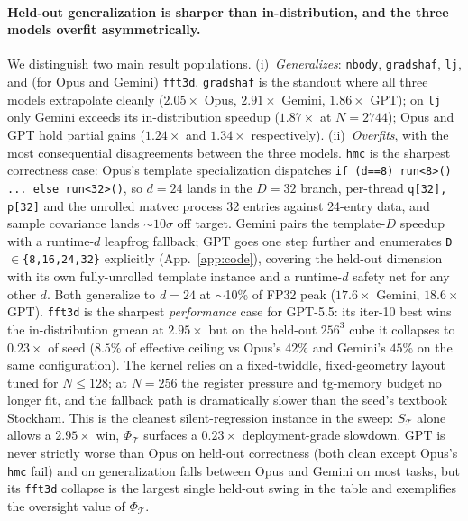 \documentclass{article}
\theoremstyle{plain}
\theoremstyle{definition}
\theoremstyle{remark}
\begin{document}
\paragraph{Held-out generalization is sharper than in-distribution, and the three models overfit asymmetrically.}
We distinguish two main result populations. (i)~\emph{Generalizes}: \texttt{nbody}, \texttt{gradshaf},
\texttt{lj}, and (for Opus and Gemini) \texttt{fft3d}. \texttt{gradshaf} is the standout where all
three models extrapolate cleanly ($2.05\times$ Opus, $2.91\times$ Gemini,
$1.86\times$ GPT); on \texttt{lj} only Gemini exceeds its in-distribution
speedup ($1.87\times$ at $N{=}2744$); Opus and GPT hold partial
gains ($1.24\times$ and $1.34\times$ respectively).
(ii)~\emph{Overfits}, with the most consequential disagreements
between the three models. \texttt{hmc} is the sharpest correctness
case: Opus's template specialization dispatches
\texttt{if (d==8) run<8>() ... else run<32>()}, so $d{=}24$ lands
in the $D{=}32$ branch, per-thread \texttt{q[32], p[32]} and the
unrolled matvec process 32 entries against 24-entry data, and
sample covariance lands ${\sim}10\sigma$ off target. Gemini pairs
the template-$D$ speedup with a runtime-$d$ leapfrog fallback;
GPT goes one step further and enumerates
\texttt{D$\in$\{8,16,24,32\}} explicitly (App.~\ref{app:code}),
covering the held-out dimension with its own fully-unrolled
template instance and a runtime-$d$ safety net for any
other $d$. Both generalize to $d{=}24$ at $\sim$10\% of FP32 peak
($17.6\times$ Gemini, $18.6\times$ GPT).
\texttt{fft3d} is the sharpest \emph{performance} case for GPT-5.5: its iter-10 best wins the in-distribution gmean at
$2.95\times$ but on the held-out $256^3$ cube it collapses to $0.23\times$ of seed
($8.5\%$ of effective ceiling vs Opus's $42\%$ and Gemini's $45\%$
on the same configuration). The kernel relies on a fixed-twiddle,
fixed-geometry layout tuned for $N{\leq}128$; at $N{=}256$ the
register pressure and tg-memory budget no longer fit, and the
fallback path is dramatically slower than the seed's textbook
Stockham. This is the cleanest silent-regression instance in the
sweep: $S_\mathcal{T}$ alone allows a $2.95\times$ win,
$\Phi_\mathcal{T}$ surfaces a $0.23\times$ deployment-grade
slowdown. GPT is never strictly worse than Opus on
held-out correctness (both clean except Opus's \texttt{hmc} fail) and on
generalization falls between Opus and Gemini on most tasks, but
its \texttt{fft3d} collapse is the largest single held-out swing in the
table and exemplifies the oversight value of $\Phi_\mathcal{T}$.
\end{document}

